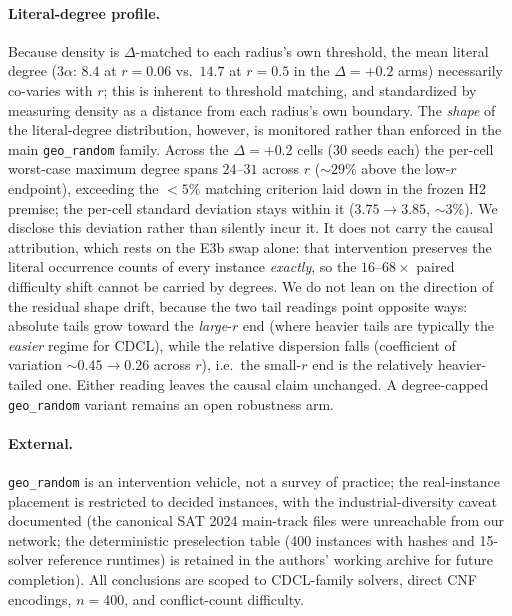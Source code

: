 \documentclass[manuscript, screen, review]{jair}
\begin{document}
\paragraph{Literal-degree profile.}
Because density is $\Delta$-matched to each radius's own threshold, the mean
literal degree ($3\alpha$: $8.4$ at $r=0.06$ vs.\ $14.7$ at $r=0.5$ in the
$\Delta{=}{+}0.2$ arms) necessarily co-varies with $r$; this is inherent to
threshold matching, and standardized by measuring density as a distance from
each radius's own boundary. The \emph{shape} of the literal-degree
distribution, however, is monitored rather than enforced in the main
\texttt{geo\_random} family. Across the $\Delta{=}{+}0.2$ cells (30 seeds
each) the per-cell worst-case maximum degree spans $24$--$31$ across $r$
(${\sim}29\%$ above the low-$r$ endpoint), exceeding the ${<}5\%$ matching
criterion laid down in the frozen H2 premise; the per-cell standard
deviation stays within it ($3.75 \to 3.85$, ${\sim}3\%$). We disclose this
deviation rather than silently incur it. It does not carry the causal
attribution, which rests on the E3b swap alone: that intervention preserves
the literal occurrence counts of every instance \emph{exactly}, so the
$16$--$68\times$ paired difficulty shift cannot be carried by degrees. We do
not lean on the direction of the residual shape drift, because the two tail
readings point opposite ways: absolute tails grow toward the \emph{large}-$r$
end (where heavier tails are typically the \emph{easier} regime for CDCL),
while the relative dispersion falls (coefficient of variation ${\sim}0.45 \to
0.26$ across $r$), i.e.\ the small-$r$ end is the relatively heavier-tailed
one. Either reading leaves the causal claim unchanged. A degree-capped
\texttt{geo\_random} variant remains an open robustness arm.

\paragraph{External.}
\texttt{geo\_random} is an intervention vehicle, not a survey of practice;
the real-instance placement is restricted to decided instances, with the
industrial-diversity caveat documented (the canonical SAT 2024 main-track
files were unreachable from our network; the deterministic preselection table
(400 instances with hashes and 15-solver reference runtimes) is retained
in the authors' working archive for future completion). All conclusions are scoped to CDCL-family solvers, direct CNF
encodings, $n=400$, and conflict-count difficulty.
\end{document}
